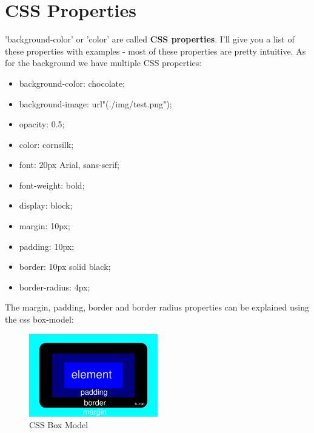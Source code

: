 \documentclass[a4paper,12pt]{article}
\begin{document}
\section{CSS Properties}
'background-color' or 'color' are called \textbf{CSS properties}. I'll give you a list of these properties with examples - most of these properties are pretty intuitive. As for the background we have multiple CSS properties:
\begin{itemize}
    \item background-color: chocolate;
    \item background-image: url"(./img/test.png");
    \item opacity: 0.5;
    \item color: cornsilk;
    \item font: 20px Arial, sans-serif;
    \item font-weight: bold;
    \item display: block;
    \item margin: 10px;
    \item padding: 10px;
    \item border: 10px solid black;
    \item border-radius: 4px;
\end{itemize}
The margin, padding, border and border radius properties can be explained using the css box-model:\\
\begin{figure}[h!]
    \centering
    \includegraphics[width=0.5\textwidth]{imgs/css-box-model}
    \caption{CSS Box Model}
    \label{fig:css-box-model}
\end{figure}
\end{document}
